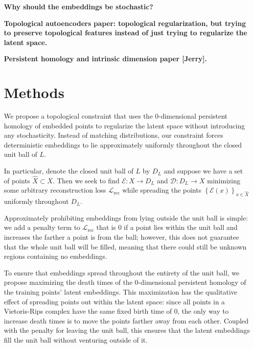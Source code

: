 \documentclass[conference]{IEEEtran}
\newcommand{\warn}[1]{\textbf{\color{red}#1}}
\begin{document}
\warn{Why should the embeddings be stochastic?}

\warn{Topological autoencoders paper: topological regularization, but trying to preserve topological features instead of just trying to regularize the latent space.}

\warn{Persistent homology and intrinsic dimension paper [Jerry].}

\section{Methods}

We propose a topological constraint that uses the 0-dimensional persistent homology of embedded points to regularize the latent space without introducing any stochasticity. Instead of matching distributions, our constraint forces deterministic embeddings to lie approximately uniformly throughout the closed unit ball of $L$.

In particular, denote the closed unit ball of $L$ by $D_{L}$ and suppose we have a set of points $\hat{X} \subset X$. Then we seek to find $\mathcal{E}:X\to D_{L}$ and $\mathcal{D}:D_{L}\to X$ minimizing some arbitrary reconstruction loss $\mathcal{L}_{\text{rec}}$ while spreading the points $\left\{ \mathcal{E}(x) \right\}_{x \in \hat{X}}$ uniformly throughout $D_{L}$.

Approximately prohibiting embeddings from lying outside the unit ball is simple: we add a penalty term to $\mathcal{L}_{\text{rec}}$ that is 0 if a point lies within the unit ball and increases the farther a point is from the ball; however, this does not guarantee that the whole unit ball will be filled, meaning that there could still be unknown regions containing no embeddings.

To ensure that embeddings spread throughout the entirety of the unit ball, we propose maximizing the death times of the 0-dimensional persistent homology of the training points' latent embeddings. This maximization has the qualitative effect of spreading points out within the latent space: since all points in a Vietoris-Rips complex have the same fixed birth time of 0, the only way to increase death times is to move the points farther away from each other. Coupled with the penalty for leaving the unit ball, this ensures that the latent embeddings fill the unit ball without venturing outside of it.
\end{document}
